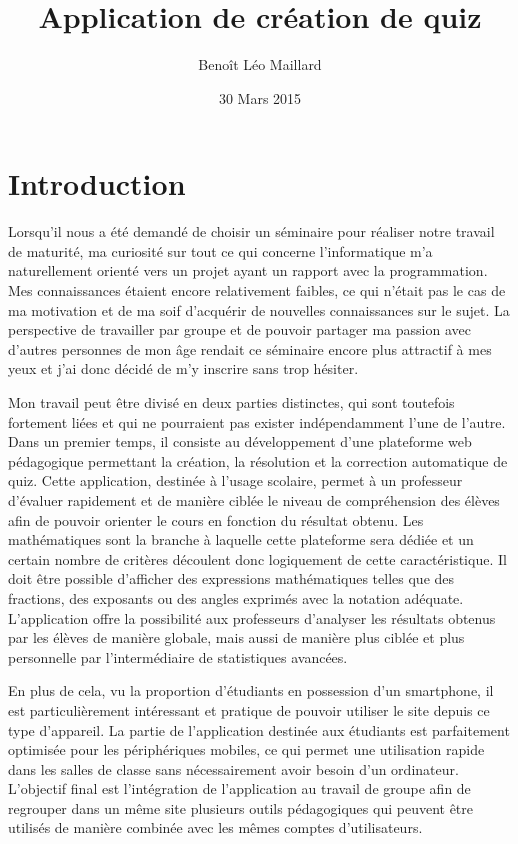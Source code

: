 \documentclass[a4paper,11pt,openany,oneside]{sphinxmanual}
\title{Application de création de quiz}
\date{30 Mars 2015}
\author{Benoît Léo Maillard}
\begin{document}
\maketitle
\tableofcontents
{}\label{index::doc}



\chapter{Introduction}
\label{introduction::doc}\label{introduction:application-de-creation-de-quiz}\label{introduction:introduction}
Lorsqu'il nous a été demandé de choisir un séminaire pour réaliser notre travail de maturité,
ma curiosité sur tout ce qui concerne l'informatique m'a naturellement orienté
vers un projet ayant un rapport avec la programmation. Mes connaissances étaient
encore relativement faibles, ce qui n'était pas le cas de ma motivation et de ma
soif d'acquérir de nouvelles connaissances sur le sujet. La perspective de travailler
par groupe et de pouvoir partager ma passion avec d'autres personnes de mon âge rendait
ce séminaire encore plus attractif à mes yeux et j'ai donc décidé de m'y inscrire
sans trop hésiter.

Mon travail peut être divisé en deux parties distinctes, qui sont toutefois fortement
liées et qui ne pourraient pas exister indépendamment l'une de l'autre. Dans un premier
temps, il consiste au développement d'une plateforme web pédagogique permettant
la création, la résolution et la correction automatique de quiz. Cette application,
destinée à l'usage scolaire, permet à un professeur d'évaluer rapidement et de
manière ciblée le niveau de compréhension des élèves afin de pouvoir orienter
le cours en fonction du résultat obtenu. Les mathématiques sont la branche à laquelle
cette plateforme sera dédiée et un certain nombre de critères découlent donc logiquement
de cette caractéristique. Il doit être possible d'afficher des expressions mathématiques
telles que des fractions, des exposants ou des angles exprimés avec la notation adéquate.
L'application offre la possibilité aux professeurs d'analyser les résultats
obtenus par les élèves de manière globale, mais aussi de manière plus ciblée et plus
personnelle par l'intermédiaire de statistiques avancées.

En plus de cela, vu la proportion d'étudiants en possession d'un smartphone, il est
particulièrement intéressant et pratique de pouvoir utiliser le site depuis ce type
d'appareil. La partie de l'application destinée aux étudiants est parfaitement optimisée pour
les périphériques mobiles, ce qui permet une utilisation rapide dans les salles de
classe sans nécessairement avoir besoin d'un ordinateur. L'objectif final est l'intégration
de l'application au travail de groupe afin de regrouper dans un même site plusieurs outils
pédagogiques qui peuvent être utilisés de manière combinée avec les mêmes comptes d'utilisateurs.
\end{document}
